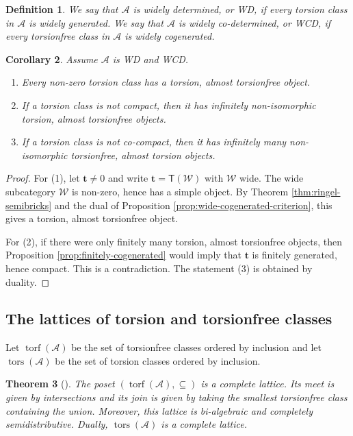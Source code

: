 \documentclass[10pt,a4paper]{amsart}
\newtheorem{theorem}{Theorem}[section]
\newtheorem{corollary}[theorem]{Corollary}
\newtheorem{definition}[theorem]{Definition}
\newcommand{\A}{\mathcal A}
\newcommand{\W}{\mathcal W}
\newcommand{\T}{\mathsf T}
\newcommand{\tors}{\operatorname{tors}}
\newcommand{\torf}{\operatorname{torf}}
\begin{document}
\begin{definition}
We say that \(\A\) is widely determined, or WD, if every torsion class in \(\A\) is widely generated. We say that \(\A\) is widely co-determined, or WCD, if every torsionfree class in \(\A\) is widely cogenerated.
\end{definition}

\begin{corollary}\label{cor:basic-wide-consequences}
Assume \(\A\) is WD and WCD.
\begin{enumerate}[label=\textup{(\arabic*)},leftmargin=2.5em]
\item Every non-zero torsion class has a torsion, almost torsionfree object.
\item If a torsion class is not compact, then it has infinitely non-isomorphic torsion, almost torsionfree objects.
\item If a torsion class is not co-compact, then it has infinitely many non-isomorphic torsionfree, almost torsion objects.
\end{enumerate}
\end{corollary}

\begin{proof}
For (1), let \(\mathbf t\neq 0\) and write \(\mathbf t=\T(\W)\) with \(\W\) wide. The wide subcategory \(\W\) is non-zero, hence has a simple object. By Theorem \ref{thm:ringel-semibricks} and the dual of Proposition \ref{prop:wide-cogenerated-criterion}, this gives a torsion, almost torsionfree object.

For (2), if there were only finitely many torsion, almost torsionfree objects, then Proposition \ref{prop:finitely-cogenerated} would imply that \(\mathbf t\) is finitely generated, hence compact. This is a contradiction. The statement (3) is obtained by duality.
\end{proof}

\subsection{The lattices of torsion and torsionfree classes}

Let \(\torf(\A)\) be the set of torsionfree classes ordered by inclusion and let \(\tors(\A)\) be the set of torsion classes ordered by inclusion.

\begin{theorem}[{\cite[Theorem 3.1]{DIRRT}}]\label{thm:torsionfree-lattice}
The poset \((\torf(\A),\subseteq)\) is a complete lattice. Its meet is given by intersections and its join is given by taking the smallest torsionfree class containing the union. Moreover, this lattice is bi-algebraic and completely semidistributive. Dually, \(\tors(\A)\) is a complete lattice.
\end{theorem}
\end{document}
